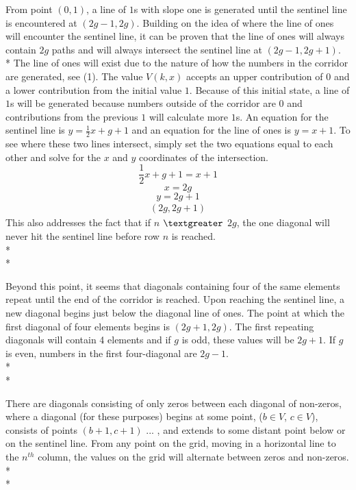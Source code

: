 \documentclass{article}
\newcommand\tab[1][1cm]{\hspace*{#1}}
\begin{document}
\tab From point $(0, 1)$, a line of $1$s with slope one is generated until the sentinel line is encountered at $(2g-1, 2g)$.
Building on the idea of where the line of ones will encounter the sentinel line, it can be proven that the line of ones will always contain $2g$ paths and will always intersect the sentinel line at $(2g-1, 2g+1)$.\\*
The line of ones will exist due to the nature of how the numbers in the corridor are generated, see (1). The value $V(k,x)$ accepts an upper contribution of $0$ and a lower contribution from the initial value $1$. Because of this initial state, a line of $1$s will be generated because numbers outside of the corridor are $0$ and contributions from the previous $1$ will calculate more $1$s. An equation for the sentinel line is $y = \frac{1}{2}x+g+1$ and an equation for the line of ones is $y=x+1$. To see where these two lines intersect, simply set the two equations equal to each other and solve for the $x$ and $y$ coordinates of the intersection.
\[\frac{1}{2}x+g+1=x+1\]
\[x = 2g\]
\[y=2g+1\]
\begin{align*}
(2g, 2g+1)
\end{align*}
This also addresses the fact that if $n$ $\textgreater$ $2g$, the one diagonal will never hit the sentinel line before row $n$ is reached.\\*\\*

Beyond this point, it seems that diagonals containing four of the same elements repeat until the end of the corridor is reached. 
Upon reaching the sentinel line, a new diagonal begins just below the diagonal line of ones. The point at which the first diagonal of four elements begins is $(2g+1, 2g)$. %
The first repeating diagonals will contain 4 elements and if $g$ is odd, these values will be $2g + 1$. 
If $g$ is even, numbers in the first four-diagonal are $2g - 1$.\\*\\*




There are diagonals consisting of only zeros between each diagonal of non-zeros, where a diagonal (for these purposes) begins 
at some point, ($b \in V$, $c \in V$), consists of points $(b+1, c+1)$ ... , and extends to 
some distant point below or on the sentinel line. From any point on
the grid, moving in a horizontal line to the $n^{th}$ column, the values on the grid will alternate between zeros and non-zeros.\\*\\*
\end{document}
